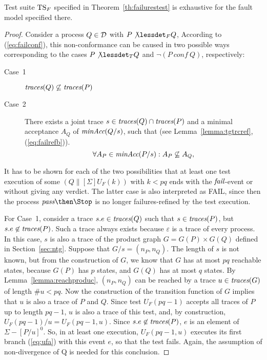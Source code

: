 \begin{lemma}\label{lemma:mainfexhaustive}
Test suite ${\text{TS}}_F$ specified in Theorem~\ref{th:failurestest} is exhaustive for the fault
model specified there.
\end{lemma}
\begin{proof}
Consider a process $Q\in{\cal D}$ with
$P\not\lessdet_F Q$, According to (\ref{eq:failconf}),  
this non-conformance can be caused in two possible ways corresponding to the cases $P\not\lessdet_T Q$ and 
$\neg(P\ conf\ Q)$, respectively:
\begin{description}
\item[Case~1] $\text{\it traces}(Q)\not\subseteq \text{\it traces}(P)$
\item[Case~2] There exists a joint trace $s\in\text{\it traces}(Q)\cap\text{\it traces}(P)$ and a minimal acceptance $A_Q$
of $\text{\it minAcc}(Q/s)$, such that
(see Lemma~\ref{lemma:tgtrcref}, (\ref{eq:failrefb})).
\begin{equation}
\label{eq:accsnotcontained}
\forall A_P\in\text{\it minAcc}(P/s): A_P\not\subseteq A_Q,
\end{equation}
\end{description}
It has to be shown for each of the two possibilities that at least one test
execution of some $(Q\parallel[\Sigma] U_F(k))$ with $k < pq$ ends with the
   ${\text{\it fail}}$-event or without giving any verdict. The latter case is also
interpreted  as FAIL, since then the process $\epass\then\Stop$ is no longer
failures-refined by the test execution.

For Case~1, consider a  trace $s.e\in\text{\it traces}(Q)$ such that $s\in\text{\it traces}(P)$, but
$s.e\not\in\text{\it traces}(P)$. Such a trace always exists because $\varepsilon$ is a
trace of every process. In this case, $s$ is also a trace of the product
graph $G = G(P)\times G(Q)$ defined in Section~\ref{sec:ntg}. Suppose that
$G/s = (n_P,n_Q)$. The length of $s$ is not known, but from the construction
of $G$,  we know that $G$ has at most $pq$ reachable states, because $G(P)$
has $p$ states, and $G(Q)$ has at most $q$ states. By
Lemma~\ref{lemma:reachproduc}, $(n_P,n_Q)$ can be reached by a trace
$u\in\text{\it traces}(G)$ of length $\#u < pq$. Now the construction of the transition
function of $G$ implies that $u$ is also a trace of $P$ and $Q$. Since test
$U_F(pq-1)$ accepts all traces of $P$ up to length $pq-1$, $u$ is also a
trace of this test, and, by construction, $U_F(pq-1)/u = U_F(pq-1,u)$. Since
$s.e\not\in\text{\it traces}(P)$, $e$ is an element of $\Sigma-[P/u]^0$. So, in at least
one execution, $U_F(pq-1,u)$ executes its first branch (\ref{eq:ufa}) with
this event $e$, so that the test fails. Again, the
assumption of non-divergence of Q is needed for this conclusion. %
 

\end{proof}
